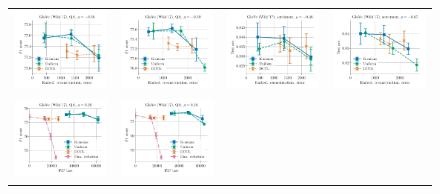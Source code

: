 \begin{figure}
	\centering
	\begin{tabular}{@{\hskip -0.0in}c@{\hskip -0.0in}c@{\hskip -0.0in}c@{\hskip -0.0in}c@{\hskip -0.0in}}
		\includegraphics[width=.245\linewidth]{figures/glove-wiki400k-am_qa_best-f1_vs_embed-frob-error_linx_det.pdf} &
		\includegraphics[width=.245\linewidth]{figures/glove-wiki400k-am_qa_best-f1_vs_embed-frob-error_linx_stoc.pdf} &
		\includegraphics[width=.245\linewidth]{figures/glove-wiki400k-am_sentiment_sst_test-acc_vs_embed-frob-error_linx_det.pdf} & 
		\includegraphics[width=.245\linewidth]{figures/glove-wiki400k-am_sentiment_sst_test-acc_vs_embed-frob-error_linx_stoc.pdf} \\
		\includegraphics[width=.245\linewidth]{figures/glove-wiki400k-am_qa_best-f1_vs_gram-large-dim-frob-error_linx_det.pdf} &
		\includegraphics[width=.245\linewidth]{figures/glove-wiki400k-am_qa_best-f1_vs_gram-large-dim-frob-error_linx_stoc.pdf} &

\end{tabular}
\end{figure}
